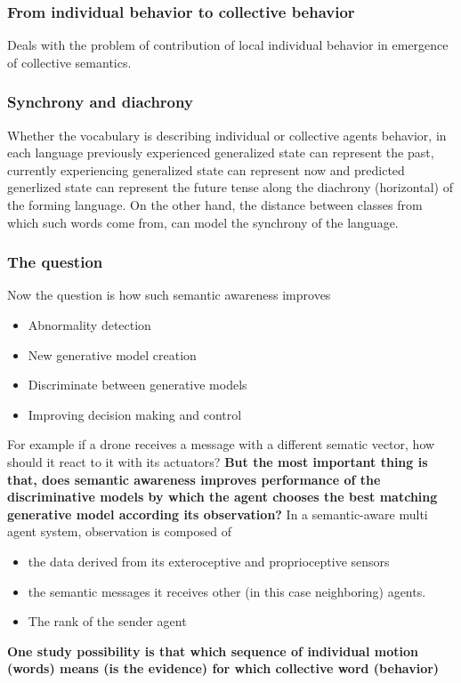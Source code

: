 \documentclass{article}
\begin{document}
			\subsubsection{From individual behavior to collective behavior}
			Deals with the problem of contribution of local individual behavior in emergence of collective semantics.
			
			
			\subsubsection{Synchrony and diachrony}
				Whether the vocabulary is describing individual or collective agents behavior, in each language previously experienced generalized state can represent the  past, currently experiencing generalized state can represent now and predicted generlized state can represent the future tense along the diachrony (horizontal) of the forming language. On the other hand, the distance between classes from which such words come from, can model the synchrony of the language.
				
			\subsubsection{The question} Now the question is how such semantic awareness improves
				\begin{itemize}
					\item Abnormality detection
					\item New generative model creation
					\item Discriminate between generative models
					\item Improving decision making and control 
				\end{itemize}
				For example if a drone receives a message with a different sematic vector, how should it react to it with its actuators?
				\textbf{But the most important thing is that, does semantic awareness improves performance of the discriminative models by which the agent chooses the best matching generative model according its observation?}
				In a semantic-aware multi agent system, 
				observation is composed of 
				\begin{itemize}
					\item the data derived from its exteroceptive and proprioceptive sensors
					\item the semantic messages it receives other (in this case neighboring) agents.
					\item The rank of the sender agent
				\end{itemize}
			\textbf{One study possibility is that which sequence of individual motion (words) means (is the evidence) for which collective word (behavior)}
		
\end{document}
